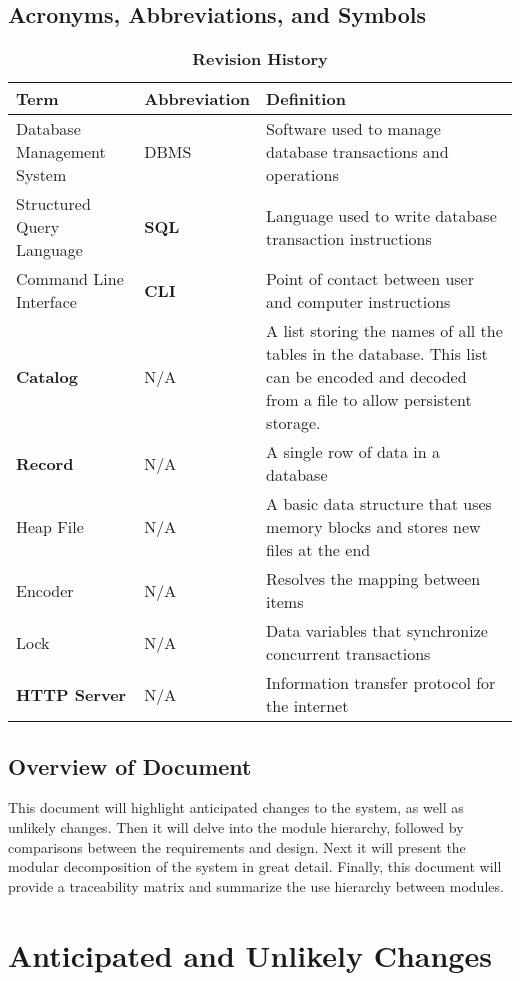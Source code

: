 \documentclass[12pt, titlepage]{article}
\begin{document}
\subsection{Acronyms, Abbreviations, and Symbols}
\begin{table}[H]
\caption{\bf Revision History}
\begin{tabularx}{\textwidth}{p{2cm}p{3cm}X}
\toprule {\bf Term} & {\bf Abbreviation} & {\bf Definition}\\
\midrule
Database Management System & DBMS & Software used to manage database transactions and operations\\
Structured Query Language & \textbf{SQL} & Language used to write database transaction instructions\\
Command Line Interface & \textbf{CLI} & Point of contact between user and computer instructions \\
\textbf{Catalog} & N/A & A list storing the names of all the tables in the database. This list can be encoded and decoded from a file to allow persistent storage.\\
\textbf{Record} & N/A & A single row of data in a database\\
Heap File & N/A & A basic data structure that uses memory blocks and stores new files at the end \\
Encoder & N/A & Resolves the mapping between items \\
Lock & N/A  & Data variables that synchronize concurrent transactions \\
\textbf{HTTP Server} & N/A & Information transfer protocol for the internet \\

\bottomrule
\end{tabularx}
\end{table}

\subsection{Overview of Document}
This document will highlight anticipated changes to the system, as well as unlikely changes. Then it will delve into the module hierarchy, followed by comparisons between the requirements and design. Next it will present the modular decomposition of the system in great detail. Finally, this document will provide a traceability matrix and summarize the use hierarchy between modules.
\section{Anticipated and Unlikely Changes} \label{SecChange}
\end{document}
